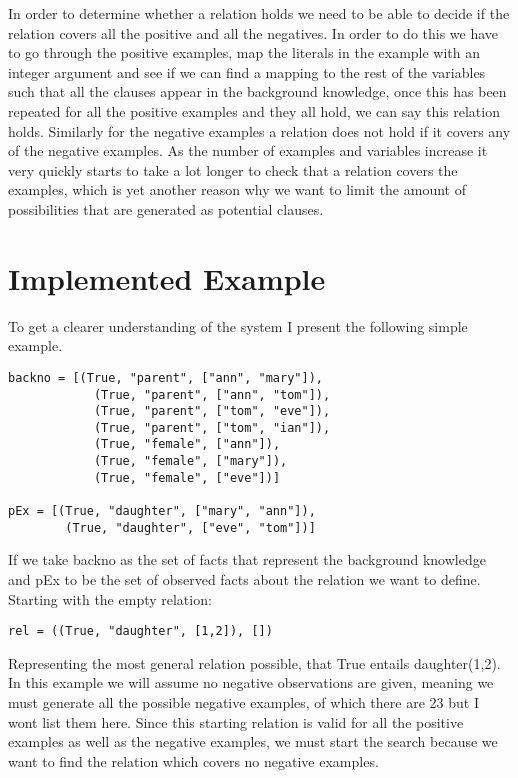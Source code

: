 \documentclass{article}
\begin{document}
In order to determine whether a relation holds we need to be able to decide if
the relation covers all the positive and all the negatives. In order to do this
we have to go through the positive examples, map the literals in the example
with an integer argument and see if we can find a mapping to the rest of the
variables such that all the clauses appear in the background knowledge, once
this has been repeated for all the positive examples and they all hold, we can
say this relation holds. Similarly for the negative examples a relation does
not hold if it covers any of the negative examples. As the number of examples
and variables increase it very quickly starts to take a lot longer to check that
a relation covers the examples, which is yet another reason why we want to
limit the amount of possibilities that are generated as potential clauses.

\section*{Implemented Example}

To get a clearer understanding of the system I present the following simple example.

\begin{verbatim}
backno = [(True, "parent", ["ann", "mary"]), 
            (True, "parent", ["ann", "tom"]),
            (True, "parent", ["tom", "eve"]),
            (True, "parent", ["tom", "ian"]),
            (True, "female", ["ann"]),
            (True, "female", ["mary"]),
            (True, "female", ["eve"])]

pEx = [(True, "daughter", ["mary", "ann"]),
        (True, "daughter", ["eve", "tom"])]
\end{verbatim}

If we take backno as the set of facts that represent the background knowledge 
and pEx to be the set of observed facts about the relation we want to define.
Starting with the empty relation:

\begin{verbatim}
rel = ((True, "daughter", [1,2]), [])
\end{verbatim}

Representing the most general relation possible, that True entails daughter(1,2).
In this example we will assume no negative observations are given, meaning we must 
generate all the possible negative examples, of which there are 23 but I wont list 
them here. Since this starting relation is valid for all the positive examples as 
well as the negative examples, we must start the search because we want to find the 
relation which covers no negative examples.
\end{document}
